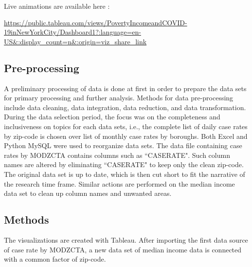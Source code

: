 \documentclass{vgtc}                 %
\begin{document}
\vspace{2mm}
\noindent Live animations are available here :

\vspace{1mm}
\noindent\url{https://public.tableau.com/views/PovertyIncomeandCOVID-19inNewYorkCity/Dashboard1?:language=en-US&:display_count=n&:origin=viz_share_link}

\subsection{Pre-processing}

A preliminary processing of data is done at first in order to prepare the data sets for primary processing and further analysis. Methods for data pre-processing include data cleaning, data integration, data reduction, and data transformation. During the data selection period, the focus was on the completeness and inclusiveness on topics for each data sets, i.e., the complete list of daily case rates by zip-code is chosen over list of monthly case rates by boroughs. Both Excel and Python MySQL were used to reorganize data sets. The data file containing case rates by MODZCTA contains columns such as ``CASERATE". Such column names are altered by eliminating ``CASERATE\textunderscore" to keep only the clean zip-code. The original data set is up to date, which is then cut short to fit the narrative of the research time frame. Similar actions are performed on the median income data set to clean up column names and unwanted areas. 

\subsection{Methods}

The visualizations are created with Tableau. After importing the first data source of case rate by MODZCTA, a new data set of median income data is connected with a common factor of zip-code. 
\end{document}
